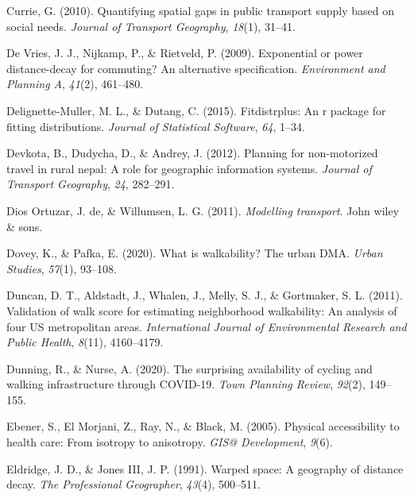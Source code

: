 \documentclass[
11pt, %
oneside, %
english, %
singlespacing, %
]{macthesis} %
\newlength{\cslhangindent}
\newenvironment{CSLReferences}[2] %
 {%
  \setlength{\parindent}{0pt}
  \ifodd #1 \everypar{\setlength{\hangindent}{\cslhangindent}}\ignorespaces\fi
  \ifnum #2 > 0
  \setlength{\parskip}{#2\baselineskip}
  \fi
 }%
 {}
\begin{document}
\begin{CSLReferences}{1}{0}
\leavevmode{}%
Currie, G. (2010). Quantifying spatial gaps in public transport supply based on social needs. \emph{Journal of Transport Geography}, \emph{18}(1), 31--41.

\leavevmode{}%
De Vries, J. J., Nijkamp, P., \& Rietveld, P. (2009). Exponential or power distance-decay for commuting? An alternative specification. \emph{Environment and Planning A}, \emph{41}(2), 461--480.

\leavevmode{}%
Delignette-Muller, M. L., \& Dutang, C. (2015). Fitdistrplus: An r package for fitting distributions. \emph{Journal of Statistical Software}, \emph{64}, 1--34.

\leavevmode{}%
Devkota, B., Dudycha, D., \& Andrey, J. (2012). Planning for non-motorized travel in rural nepal: A role for geographic information systems. \emph{Journal of Transport Geography}, \emph{24}, 282--291.

\leavevmode{}%
Dios Ortuzar, J. de, \& Willumsen, L. G. (2011). \emph{Modelling transport}. John wiley \& sons.

\leavevmode{}%
Dovey, K., \& Pafka, E. (2020). What is walkability? The urban DMA. \emph{Urban Studies}, \emph{57}(1), 93--108.

\leavevmode{}%
Duncan, D. T., Aldstadt, J., Whalen, J., Melly, S. J., \& Gortmaker, S. L. (2011). Validation of walk score for estimating neighborhood walkability: An analysis of four US metropolitan areas. \emph{International Journal of Environmental Research and Public Health}, \emph{8}(11), 4160--4179.

\leavevmode{}%
Dunning, R., \& Nurse, A. (2020). The surprising availability of cycling and walking infrastructure through COVID-19. \emph{Town Planning Review}, \emph{92}(2), 149--155.

\leavevmode{}%
Ebener, S., El Morjani, Z., Ray, N., \& Black, M. (2005). Physical accessibility to health care: From isotropy to anisotropy. \emph{GIS@ Development}, \emph{9}(6).

\leavevmode{}%
Eldridge, J. D., \& Jones III, J. P. (1991). Warped space: A geography of distance decay. \emph{The Professional Geographer}, \emph{43}(4), 500--511.


\end{CSLReferences}
\end{document}
